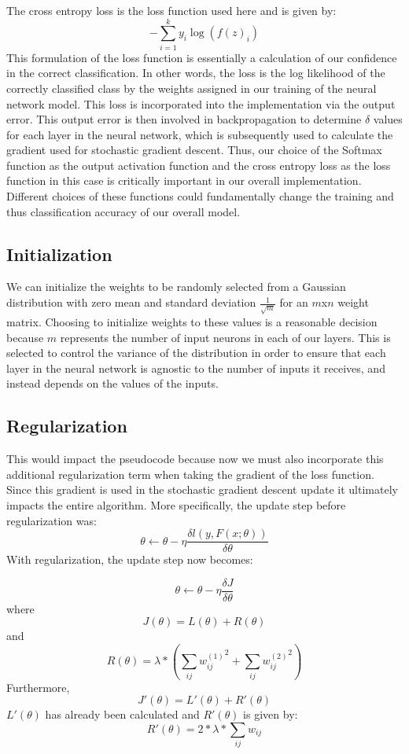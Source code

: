 \documentclass{article}
\begin{document}
The cross entropy loss is the loss function used here and is given by:
$$-\sum_{i=1}^k y_i \log(f(z)_i)$$
This formulation of the loss function is essentially a calculation of our confidence in the correct classification. In other words, the loss is the log likelihood of the correctly classified class by the weights assigned in our training of the neural network model. This loss is incorporated into the implementation via the output error. This output error is then involved in backpropagation to determine $\delta$ values for each layer in the neural network, which is subsequently used to calculate the gradient used for stochastic gradient descent. Thus, our choice of the Softmax function as the output activation function and the cross entropy loss as the loss function in this case is critically important in our overall implementation. Different choices of these functions could fundamentally change the training and thus classification accuracy of our overall model.

\subsection{Initialization}
We can initialize the weights to be randomly selected from a Gaussian distribution with zero mean and standard deviation $\frac{1}{\sqrt{m}}$ for an $m$x$n$ weight matrix. Choosing to initialize weights to these values is a reasonable decision because $m$ represents the number of input neurons in each of our layers. This is selected to control the variance of the distribution in order to ensure that each layer in the neural network is agnostic to the number of inputs it receives, and instead depends on the values of the inputs.

\subsection{Regularization}
This would impact the pseudocode because now we must also incorporate this additional regularization term when taking the gradient of the loss function. Since this gradient is used in the stochastic gradient descent update it ultimately impacts the entire algorithm. More specifically, the update step before regularization was:
$$\theta \leftarrow \theta - \eta \frac{\delta l(y,F(x;\theta))}{\delta \theta}$$
With regularization, the update step now becomes:

$$\theta \leftarrow \theta - \eta \frac{\delta J}{\delta \theta}$$
where
$$J(\theta) = L(\theta) + R(\theta)$$
and
$$R(\theta) = \lambda *(\sum_{ij} {w_{ij}^{(1)}}^2 + \sum_{ij} {w_{ij}^{(2)}}^2)$$
Furthermore,
$$J'(\theta) = L'(\theta) + R'(\theta)$$
$L'(\theta)$ has already been calculated and $R'(\theta)$ is given by:
$$R'(\theta) = 2* \lambda * \sum_{ij} w_{ij}$$
\end{document}
